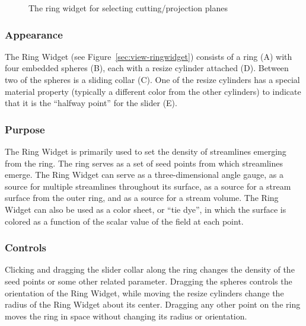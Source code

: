 \begin{figure}[htb]
  \begin{makeimage}
  \end{makeimage}
  \ringwidget
  \caption{\label{fig:ringwidget} The ring widget for selecting
    cutting/projection planes}
\end{figure}


\subsubsection{Appearance} The Ring
Widget (see Figure~\ref{sec:view-ringwidget}) consists of a ring (A)
with four embedded spheres (B), each with a resize cylinder
attached (D).  Between two of the spheres is a sliding collar (C).
One of the resize cylinders has a special material property (typically
a different color from the other cylinders) to indicate that it is the
``halfway point'' for the slider (E).

\subsubsection{Purpose} The Ring Widget is primarily used to set the
density of streamlines emerging from the ring. The ring serves as a set of
seed points from which streamlines emerge. The Ring Widget can 
serve as a three-dimensional angle gauge, as a source for multiple
streamlines throughout its surface, as a source for a stream surface from
the outer ring, and as a source for a stream volume.  The Ring Widget can 
also be used as a color sheet, or ``tie dye'', in which the surface is colored as 
a function of the scalar value of the field at each point.

\subsubsection{Controls} Clicking and dragging the slider collar along the
ring changes the density of the seed points or some other related
parameter.  Dragging the spheres controls the orientation of the Ring
Widget, while moving the resize cylinders change the radius of the Ring
Widget about its center.  Dragging any other point on the ring moves the
ring in space without changing its radius or orientation.


